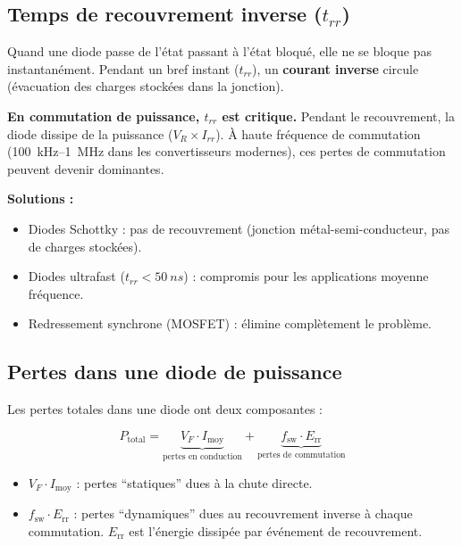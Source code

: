 \documentclass[12pt,a4paper,twoside]{book}
\begin{document}
\subsection{Temps de recouvrement inverse ($t_{rr}$)}

Quand une diode passe de l'état passant à l'état bloqué, elle ne se bloque pas instantanément. Pendant un bref instant ($t_{rr}$), un \textbf{courant inverse} circule (évacuation des charges stockées dans la jonction).

\begin{attention}
\textbf{En commutation de puissance, $t_{rr}$ est critique.} Pendant le recouvrement, la diode dissipe de la puissance ($V_R \times I_{rr}$). À haute fréquence de commutation (\SI{100}{kHz}--\SI{1}{MHz} dans les convertisseurs modernes), ces pertes de commutation peuvent devenir dominantes.

\textbf{Solutions :}
\begin{itemize}[nosep]
\item Diodes Schottky : pas de recouvrement (jonction métal-semi-conducteur, pas de charges stockées).
\item Diodes ultrafast ($t_{rr} < \SI{50}{ns}$) : compromis pour les applications moyenne fréquence.
\item Redressement synchrone (MOSFET) : élimine complètement le problème.
\end{itemize}
\end{attention}

\subsection{Pertes dans une diode de puissance}

Les pertes totales dans une diode ont deux composantes :

\begin{formule}
\[
\boxed{P_{\text{total}} = \underbrace{V_F \cdot I_{\text{moy}}}_{\text{pertes en conduction}} + \underbrace{f_{\text{sw}} \cdot E_{\text{rr}}}_{\text{pertes de commutation}}}
\]
\begin{itemize}[nosep]
\item $V_F \cdot I_{\text{moy}}$ : pertes ``statiques'' dues à la chute directe.
\item $f_{\text{sw}} \cdot E_{\text{rr}}$ : pertes ``dynamiques'' dues au recouvrement inverse à chaque commutation. $E_{\text{rr}}$ est l'énergie dissipée par événement de recouvrement.
\end{itemize}
\end{formule}
\end{document}
